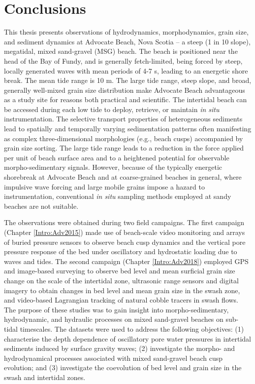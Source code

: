 \chapter{Conclusions}\label{Chapter:Conclusions}

This thesis presents observations of hydrodynamics, morphodynamics, grain size, and sediment dynamics at Advocate Beach, Nova Scotia -- a steep (1 in 10 slope), megatidal, mixed sand-gravel (MSG) beach. The beach is positioned near the head of the Bay of Fundy, and is generally fetch-limited, being forced by steep, locally generated waves with mean periods of 4-7 s, leading to an energetic shore break. The mean tide range is 10 m. The large tide range, steep slope, and broad, generally well-mixed grain size distribution make Advocate Beach advantageous as a study site for reasons both practical and scientific. The intertidal beach can be accessed during each low tide to deploy, retrieve, or maintain \textit{in situ} instrumentation. The selective transport properties of heterogeneous sediments lead to spatially and temporally varying sedimentation patterns often manifesting as complex three-dimensional morphologies (e.g., beach cusps) accompanied by grain size sorting. The large tide range leads to a reduction in the force applied per unit of beach surface area and to a heightened potential for observable morpho-sedimentary signals. However, because of the typically energetic shorebreak at Advocate Beach and at coarse-grained beaches in general, where impulsive wave forcing and large mobile grains impose a hazard to instrumentation, conventional \textit{in situ} sampling methods employed at sandy beaches are not suitable.

The observations were obtained during two field campaigns. The first campaign (Chapter \ref{Intro:Adv2015}) made use of beach-scale video monitoring and arrays of buried pressure sensors to observe beach cusp dynamics and the vertical pore pressure response of the bed under oscillatory and hydrostatic loading due to waves and tides. The second campaign (Chapter \ref{Intro:Adv2018}) employed GPS and image-based surveying to observe bed level and mean surficial grain size change on the scale of the intertidal zone, ultrasonic range sensors and digital imagery to obtain changes in bed level and mean grain size in the swash zone, and video-based Lagrangian tracking of natural cobble tracers in swash flows. The purpose of these studies was to gain insight into morpho-sedimentary, hydrodynamic, and hydraulic processes on mixed sand-gravel beaches on sub-tidal timescales. The datasets were used to address the following objectives: (1) characterise the depth dependence of oscillatory pore water pressures in intertidal sediments induced by surface gravity waves; (2) investigate the morpho- and hydrodynamical processes associated with mixed sand-gravel beach cusp evolution; and (3) investigate the coevolution of bed level and grain size in the swash and intertidal zones.

